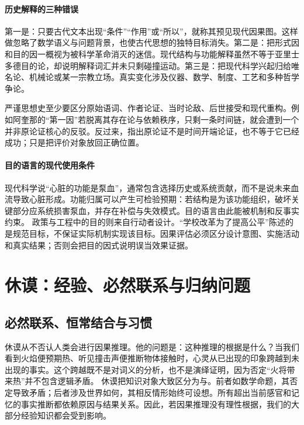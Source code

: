 \paragraph{历史解释的三种错误}

第一是：只要古代文本出现“条件”“作用”或“所以”，就称其预见现代因果图。这样做忽略了数学语义与问题背景，也使古代思想的独特目标消失。第二是：把形式因和目的因一概视为被科学革命消灭的迷信。现代结构与功能解释虽然不等于亚里士多德目的论，却说明解释词汇并未只剩碰撞运动。第三是：把现代科学兴起归给唯名论、机械论或某一宗教立场。真实变化涉及仪器、数学、制度、工艺和多种哲学争论。

严谨思想史至少要区分原始语词、作者论证、当时论敌、后世接受和现代重构。例如阿奎那的“第一因”若脱离其存在论与依赖秩序，只剩一条时间链，就会遭到一个并非原论证核心的反驳。反过来，指出原论证不是时间开端论证，也不等于它已经成功；只是把评价对象放回正确位置。

\paragraph{目的语言的现代使用条件}

现代科学说“心脏的功能是泵血”，通常包含选择历史或系统贡献，而不是说未来血流导致心脏形成。功能归属可以产生可检验预期：若结构是为该功能组织，破坏关键部分应系统损害泵血，并存在补偿与失效模式。目的语言由此能被机制和反事实约束。
政策与工程中的目的则来自行动者设计。“学校改革为了提高公平”陈述的是规范目标，不保证实际机制实现该目标。因果评估必须区分设计意图、实施活动和真实结果；否则会把目的因式说明误当效果证据。

\section{休谟：经验、必然联系与归纳问题}

\subsection{必然联系、恒常结合与习惯}

休谟从不否认人类会进行因果推理。他的问题是：这种推理的根据是什么？当我们看到火焰便预期热、听见撞击声便推断物体接触时，心灵从已出现的印象跨越到未出现的事实。这个跨越既不是对词义的分析，也不是演绎证明，因为否定“火将带来热”并不包含逻辑矛盾\parencite{humeTreatise,humeEnquiry}。
休谟把知识对象大致区分为与。前者如数学命题，其否定导致矛盾；后者涉及世界如何，其相反情形始终可设想。所有超出当前感官和记忆的事实推断都依赖原因与结果关系。因此，若因果推理没有理性根据，我们的大部分经验知识都会受到影响。

